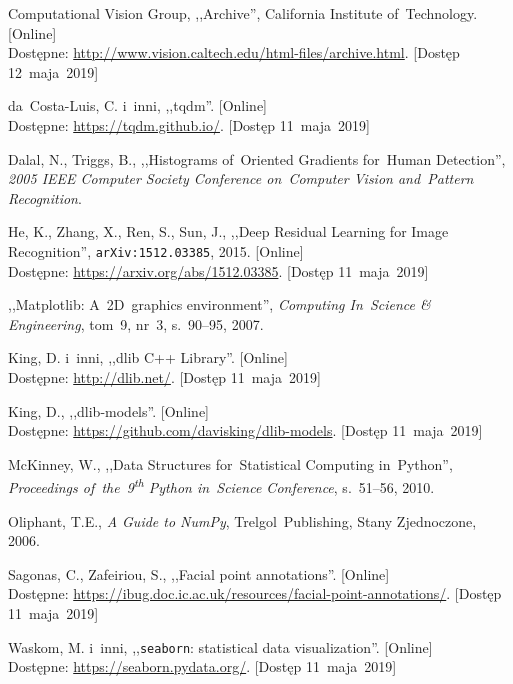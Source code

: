 \documentclass[11pt,a4paper]{article}
\begin{document}
\begin{thebibliography}{9}

        Computational Vision Group,
        ,,Archive'',
        California Institute of~Technology.
        [Online]
        \\
        Dostępne: \url{http://www.vision.caltech.edu/html-files/archive.html}.
        [Dostęp 12~maja~2019]

        da~Costa-Luis, C. i~inni,
        ,,tqdm''.
        [Online]
        \\
        Dostępne: \url{https://tqdm.github.io/}.
        [Dostęp 11~maja~2019]

        Dalal, N.,
        Triggs, B.,
        ,,Histograms of~Oriented Gradients for~Human Detection'',
        \emph{2005 IEEE Computer Society Conference on~Computer Vision and~Pattern Recognition}.

        He, K.,
        Zhang, X.,
        Ren, S.,
        Sun, J.,
        ,,Deep Residual Learning for Image Recognition'',
        {\tt arXiv:1512.03385},
        2015.
        [Online]
        \\
        Dostępne: \url{https://arxiv.org/abs/1512.03385}.
        [Dostęp 11~maja~2019]

        ,,Matplotlib: A~2D~graphics environment'',
        \emph{Computing In~Science \& Engineering},
        tom~9,
        nr~3,
        s.~90--95,
        2007.

        King, D. i~inni,
        ,,dlib C++ Library''.
        [Online]
        \\
        Dostępne: \url{http://dlib.net/}.
        [Dostęp 11~maja~2019]

        King, D.,
        ,,dlib-models''.
        [Online]
        \\
        Dostępne: \url{https://github.com/davisking/dlib-models}.
        [Dostęp 11~maja~2019]

        McKinney, W.,
        ,,Data Structures for~Statistical Computing in~Python'',
        \emph{Proceedings of~the~9\textsuperscript{th} Python in~Science Conference},
        s.~51--56,
        2010.

        Oliphant, T.E.,
        \emph{A Guide to NumPy},
        Trelgol~Publishing,
        Stany Zjednoczone,
        2006.

        Sagonas, C.,
        Zafeiriou, S.,
        ,,Facial point annotations''.
        [Online]
        \\
        Dostępne: \url{https://ibug.doc.ic.ac.uk/resources/facial-point-annotations/}.
        [Dostęp 11~maja~2019]

        Waskom, M. i~inni,
        ,,\texttt{seaborn}: statistical data visualization''.
        [Online]
        \\
        Dostępne: \url{https://seaborn.pydata.org/}.
        [Dostęp 11~maja~2019]

\end{thebibliography}
\end{document}
